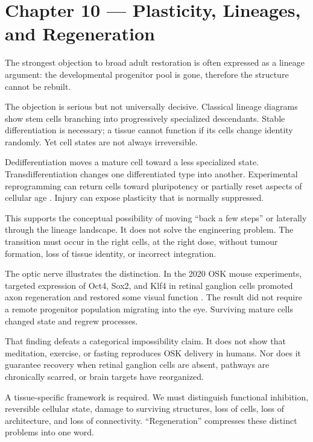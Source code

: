 \chapter{Chapter 10 --- Plasticity, Lineages, and Regeneration}\label{chapter-10-plasticity-lineages-and-regeneration}

The strongest objection to broad adult restoration is often expressed as a lineage argument: the developmental progenitor pool is gone, therefore the structure cannot be rebuilt.

The objection is serious but not universally decisive. Classical lineage diagrams show stem cells branching into progressively specialized descendants. Stable differentiation is necessary; a tissue cannot function if its cells change identity randomly. Yet cell states are not always irreversible.

Dedifferentiation moves a mature cell toward a less specialized state. Transdifferentiation changes one differentiated type into another. Experimental reprogramming can return cells toward pluripotency or partially reset aspects of cellular age \autocite{merrell2016plasticity,yucel2024reprogramming}. Injury can expose plasticity that is normally suppressed.

This supports the conceptual possibility of moving ``back a few steps'' or laterally through the lineage landscape. It does not solve the engineering problem. The transition must occur in the right cells, at the right dose, without tumour formation, loss of tissue identity, or incorrect integration.

The optic nerve illustrates the distinction. In the 2020 OSK mouse experiments, targeted expression of Oct4, Sox2, and Klf4 in retinal ganglion cells promoted axon regeneration and restored some visual function \autocite{lu2020reprogramming}. The result did not require a remote progenitor population migrating into the eye. Surviving mature cells changed state and regrew processes.

That finding defeats a categorical impossibility claim. It does not show that meditation, exercise, or fasting reproduces OSK delivery in humans. Nor does it guarantee recovery when retinal ganglion cells are absent, pathways are chronically scarred, or brain targets have reorganized.

A tissue-specific framework is required. We must distinguish functional inhibition, reversible cellular state, damage to surviving structures, loss of cells, loss of architecture, and loss of connectivity. ``Regeneration'' compresses these distinct problems into one word.

